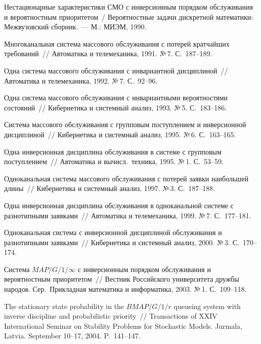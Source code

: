 \begin{multicols}{2}
{{\begin{thebibliography}{99}
Нестационарные характеристики СМО с инверсионным порядком
обслуживания и вероятностным приоритетом~/ Вероятностные задачи
дискретной математики: Межвузовский сборник.~--- М.: МИЭМ, 1990.

Многоканальная система массового обслуживания с потерей
кратчайших требований~// Автоматика и телемеханика, 1991. №\,7. С.~187--189.

 Одна система массового обслуживания с инвариантной
дисциплиной~// Автоматика и телемеханика, 1992. №\,7. С.~92--96.

Одна система массового обслуживания с инвариантными
вероятностями состояний~// Кибернетика и системный анализ, 1993.
№\,5. С.~183--186.

Система массового обслуживания с групповым поступлением
и инверсионной дисциплиной~// Кибернетика и системный анализ,
1995. №\,6. С.~163--165.

Одна инверсионная дисциплина обслуживания в системе
с групповым поступлением~// Автоматика и вычисл.\ техника, 1995.
№\,1. С.~53--59.

Одноканальная система массового обслуживания с потерей
заявки наибольшей длины~// Кибернетика и системный анализ, 1997.
№\,3. С.~187--188.

Одна инверсионная дисциплина обслуживания в одноканальной
системе с разнотипными заявками~// Автоматика и телемеханика, 1999.
№\,7. С.~177--181.

Одноканальная система с инверсионной дисциплиной
обслуживания и разнотипными заявками~//
Кибернетика и системный анализ, 2000. №\,3. С.~170--174.

Система $M\!AP/G/1/\infty$ с инверсионным порядком обслуживания и вероятностным
приоритетом~// Вестник Российского университета дружбы народов.
Сер.\ Прикладная математика и информатика, 2003. №\,1. С.~109--118.

The stationary state probability in the $BMAP/G/1/r$ queueing system
with inverse discipline and probabilistic priority~//
Transactions of XXIV International Seminar on Stability Problems for
Stochastic Models. Jurmala, Latvia. September 10--17, 2004. P.~141--147.


\end{thebibliography}}}
\end{multicols}
